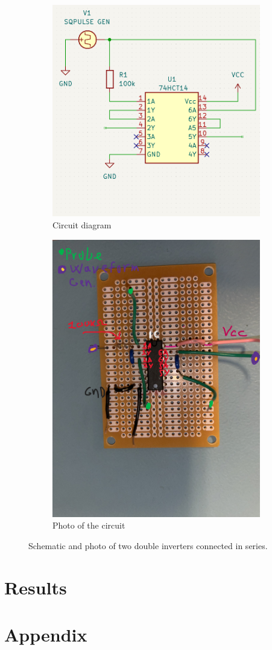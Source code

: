\documentclass[onecolumn]{article}
\begin{document}
\begin{figure}[h!]
    \centering
    \begin{subfigure}{.5\textwidth}
      \centering
      \includegraphics[width=.78\linewidth]{Task 1 Circuit.png}
      \caption{Circuit diagram}
      \label{fig:sub1}
    \end{subfigure}%
    \begin{subfigure}{.5\textwidth}
      \centering
      \includegraphics[width=.6\linewidth]{Photo of circuit.jpg}
      \caption{Photo of the circuit}
      \label{fig:sub2}
    \end{subfigure}
    \caption{Schematic and photo of two double inverters connected in series.}
    \label{fig:test}
    \end{figure}
\section*{Results}
\section*{Appendix}
\end{document}
